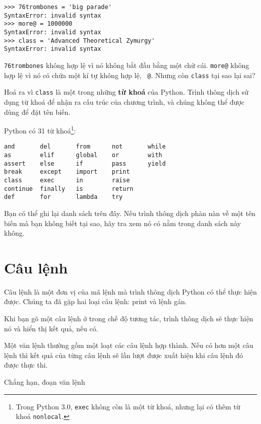 \documentclass[11pt]{book}
\begin{document}
\beforeverb
\begin{verbatim}
>>> 76trombones = 'big parade'
SyntaxError: invalid syntax
>>> more@ = 1000000
SyntaxError: invalid syntax
>>> class = 'Advanced Theoretical Zymurgy'
SyntaxError: invalid syntax
\end{verbatim}
\afterverb
%
{\tt 76trombones} không hợp lệ vì nó không bắt đầu bằng một chữ cái.
{\tt more@} không hợp lệ vì nó có chứa một kí tự không hợp lệ, {\tt
@}. Nhưng còn {\tt class} tại sao lại sai?

Hoá ra vì {\tt class} là một trong những {\bf từ khoá} của Python. 
Trình thông dịch sử dụng từ khoá để nhận ra cấu trúc của chương trình,
và chúng không thể được dùng để đặt tên biến.


Python có 31 từ khoá\footnote{Trong Python 3.0, {\tt exec} không còn
là một từ khoá, nhưng lại có thêm từ khoá {\tt nonlocal}.}:

\beforeverb
\begin{verbatim}
and       del       from      not       while    
as        elif      global    or        with     
assert    else      if        pass      yield    
break     except    import    print              
class     exec      in        raise              
continue  finally   is        return             
def       for       lambda    try
\end{verbatim}
\afterverb
%
Bạn có thể ghi lại danh sách trên đây. Nếu trình thông dịch phàn nàn
về một tên biến mà bạn không biết tại sao, hãy tra xem nó có nằm trong
danh sách này không.


\section{Câu lệnh}

Câu lệnh là một đơn vị của mã lệnh mà trình thông dịch Python
có thể thực hiện được. Chúng ta đã gặp hai loại câu lệnh: print
và lệnh gán.


Khi bạn gõ một câu lệnh ở trong chế độ tương tác, trình thông dịch
sẽ thực hiện nó và hiển thị kết quả, nếu có.

Một văn lệnh thường gồm một loạt các câu lệnh hợp thành. Nếu có
hơn một câu lệnh thì kết quả  của từng câu lệnh sẽ lần lượt được
xuất hiện khi câu lệnh đó được thực thi.

Chẳng hạn, đoạn văn lệnh
\end{document}
